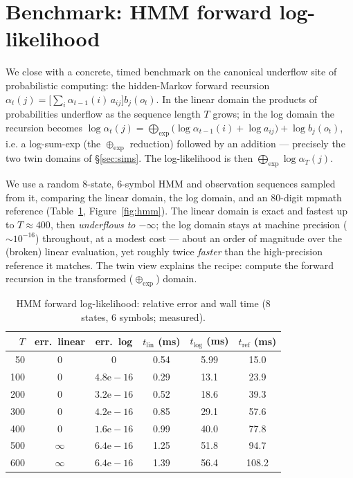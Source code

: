 \documentclass[11pt,a4paper]{article}
\theoremstyle{definition}
\begin{document}
\appendix

\section{Benchmark: HMM forward log-likelihood}
\label{app:hmm}

We close with a concrete, timed benchmark on the canonical underflow site of
probabilistic computing: the hidden-Markov forward recursion
$\alpha_t(j)=\bigl[\sum_i\alpha_{t-1}(i)\,a_{ij}\bigr]b_j(o_t)$. In the linear
domain the products of probabilities underflow as the sequence length $T$ grows;
in the log domain the recursion becomes
$\log\alpha_t(j)=\bigoplus_{\exp}\!\big(\log\alpha_{t-1}(i)+\log a_{ij}\big)
+\log b_j(o_t)$, i.e. a log-sum-exp (the $\oplus_{\exp}$ reduction) followed by an
addition --- precisely the two twin domains of \S\ref{sec:sims}. The
log-likelihood is then $\bigoplus_{\exp}\log\alpha_T(j)$.

We use a random $8$-state, $6$-symbol HMM and observation sequences sampled from
it, comparing the linear domain, the log domain, and an $80$-digit mpmath
reference (Table~\ref{tab:hmm}, Figure~\ref{fig:hmm}). The linear domain is exact
and fastest up to $T\approx 400$, then \emph{underflows to $-\infty$}; the log
domain stays at machine precision ($\sim 10^{-16}$) throughout, at a modest cost
--- about an order of magnitude over the (broken) linear evaluation, yet roughly
twice \emph{faster} than the high-precision reference it matches. The twin view
explains the recipe: compute the forward recursion in the transformed
($\oplus_{\exp}$) domain.

\begin{table}[ht]
\centering
\caption{HMM forward log-likelihood: relative error and wall time
(8 states, 6 symbols; measured).}
\label{tab:hmm}
\begin{tabular}{rccccc}
\toprule
$T$ & err.\ linear & err.\ log & $t_\mathrm{lin}$ (ms) & $t_\mathrm{log}$ (ms) & $t_\mathrm{ref}$ (ms) \\
\midrule
50  & $0$        & $0$        & 0.54 & 5.99  & 15.0 \\
100 & $0$        & $4.8\mathrm{e}{-}16$ & 0.29 & 13.1 & 23.9 \\
200 & $0$        & $3.2\mathrm{e}{-}16$ & 0.52 & 18.6 & 39.3 \\
300 & $0$        & $4.2\mathrm{e}{-}16$ & 0.85 & 29.1 & 57.6 \\
400 & $0$        & $1.6\mathrm{e}{-}16$ & 0.99 & 40.0 & 77.8 \\
500 & $\infty$   & $6.4\mathrm{e}{-}16$ & 1.25 & 51.8 & 94.7 \\
600 & $\infty$   & $6.4\mathrm{e}{-}16$ & 1.39 & 56.4 & 108.2 \\
\bottomrule
\end{tabular}
\end{table}
\end{document}
